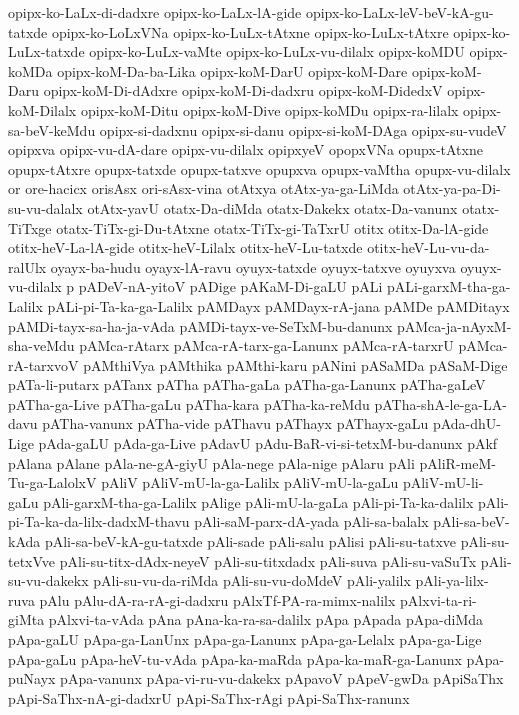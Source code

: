 {opipx-ko-LaLx-di-dadxre
opipx-ko-LaLx-lA-gide
opipx-ko-LaLx-leV-beV-kA-gu-tatxde
opipx-ko-LoLxVNa
opipx-ko-LuLx-tAtxne
opipx-ko-LuLx-tAtxre
opipx-ko-LuLx-tatxde
opipx-ko-LuLx-vaMte
opipx-ko-LuLx-vu-dilalx
opipx-koMDU
opipx-koMDa
opipx-koM-Da-ba-Lika
opipx-koM-DarU
opipx-koM-Dare
opipx-koM-Daru
opipx-koM-Di-dAdxre
opipx-koM-Di-dadxru
opipx-koM-DidedxV
opipx-koM-Dilalx
opipx-koM-Ditu
opipx-koM-Dive
opipx-koMDu
opipx-ra-lilalx
opipx-sa-beV-keMdu
opipx-si-dadxnu
opipx-si-danu
opipx-si-koM-DAga
opipx-su-vudeV
opipxva
opipx-vu-dA-dare
opipx-vu-dilalx
opipxyeV
opopxVNa
opupx-tAtxne
opupx-tAtxre
opupx-tatxde
opupx-tatxve
opupxva
opupx-vaMtha
opupx-vu-dilalx
or
ore-hacicx
orisAsx
ori-sAsx-vina
otAtxya
otAtx-ya-ga-LiMda
otAtx-ya-pa-Di-su-vu-dalalx
otAtx-yavU
otatx-Da-diMda
otatx-Dakekx
otatx-Da-vanunx
otatx-TiTxge
otatx-TiTx-gi-Du-tAtxne
otatx-TiTx-gi-TaTxrU
otitx
otitx-Da-lA-gide
otitx-heV-La-lA-gide
otitx-heV-Lilalx
otitx-heV-Lu-tatxde
otitx-heV-Lu-vu-da-ralUlx
oyayx-ba-hudu
oyayx-lA-ravu
oyuyx-tatxde
oyuyx-tatxve
oyuyxva
oyuyx-vu-dilalx
p
pADeV-nA-yitoV
pADige
pAKaM-Di-gaLU
pALi
pALi-garxM-tha-ga-Lalilx
pALi-pi-Ta-ka-ga-Lalilx
pAMDayx
pAMDayx-rA-jana
pAMDe
pAMDitayx
pAMDi-tayx-sa-ha-ja-vAda
pAMDi-tayx-ve-SeTxM-bu-danunx
pAMca-ja-nAyxM-sha-veMdu
pAMca-rAtarx
pAMca-rA-tarx-ga-Lanunx
pAMca-rA-tarxrU
pAMca-rA-tarxvoV
pAMthiVya
pAMthika
pAMthi-karu
pANini
pASaMDa
pASaM-Dige
pATa-li-putarx
pATanx
pATha
pATha-gaLa
pATha-ga-Lanunx
pATha-gaLeV
pATha-ga-Live
pATha-gaLu
pATha-kara
pATha-ka-reMdu
pATha-shA-le-ga-LA-davu
pATha-vanunx
pATha-vide
pAThavu
pAThayx
pAThayx-gaLu
pAda-dhU-Lige
pAda-gaLU
pAda-ga-Live
pAdavU
pAdu-BaR-vi-si-tetxM-bu-danunx
pAkf
pAlana
pAlane
pAla-ne-gA-giyU
pAla-nege
pAla-nige
pAlaru
pAli
pAliR-meM-Tu-ga-LalolxV
pAliV
pAliV-mU-la-ga-Lalilx
pAliV-mU-la-gaLu
pAliV-mU-li-gaLu
pAli-garxM-tha-ga-Lalilx
pAlige
pAli-mU-la-gaLa
pAli-pi-Ta-ka-dalilx
pAli-pi-Ta-ka-da-lilx-dadxM-thavu
pAli-saM-parx-dA-yada
pAli-sa-balalx
pAli-sa-beV-kAda
pAli-sa-beV-kA-gu-tatxde
pAli-sade
pAli-salu
pAlisi
pAli-su-tatxve
pAli-su-tetxVve
pAli-su-titx-dAdx-neyeV
pAli-su-titxdadx
pAli-suva
pAli-su-vaSuTx
pAli-su-vu-dakekx
pAli-su-vu-da-riMda
pAli-su-vu-doMdeV
pAli-yalilx
pAli-ya-lilx-ruva
pAlu
pAlu-dA-ra-rA-gi-dadxru
pAlxTf-PA-ra-mimx-nalilx
pAlxvi-ta-ri-giMta
pAlxvi-ta-vAda
pAna
pAna-ka-ra-sa-dalilx
pApa
pApada
pApa-diMda
pApa-gaLU
pApa-ga-LanUnx
pApa-ga-Lanunx
pApa-ga-Lelalx
pApa-ga-Lige
pApa-gaLu
pApa-heV-tu-vAda
pApa-ka-maRda
pApa-ka-maR-ga-Lanunx
pApa-puNayx
pApa-vanunx
pApa-vi-ru-vu-dakekx
pApavoV
pApeV-gwDa
pApiSaThx
pApi-SaThx-nA-gi-dadxrU
pApi-SaThx-rAgi
pApi-SaThx-ranunx
}

